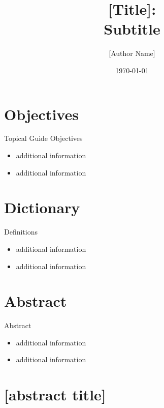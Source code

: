 \documentclass{beamer}
\title{[Title]:\\Subtitle}
\author{[Author Name]}
\date{\today}
\begin{document}
\frame{\titlepage}


\section{Objectives}
\begin{frame}{Topical Guide Objectives}
  \begin{itemize}
    \item<1-> additional information
    \item<2-> additional information
  \end{itemize}
\end{frame}


\section{Dictionary}
\begin{frame}{Definitions}
  \begin{itemize}
    \item<1-> additional information
    \item<2-> additional information
  \end{itemize}
\end{frame}


\section{Abstract}
\begin{frame}{Abstract}
  \begin{itemize}
    \item<1-> additional information
    \item<2-> additional information
  \end{itemize}
\end{frame}


\section{[abstract title]}
\end{document}
